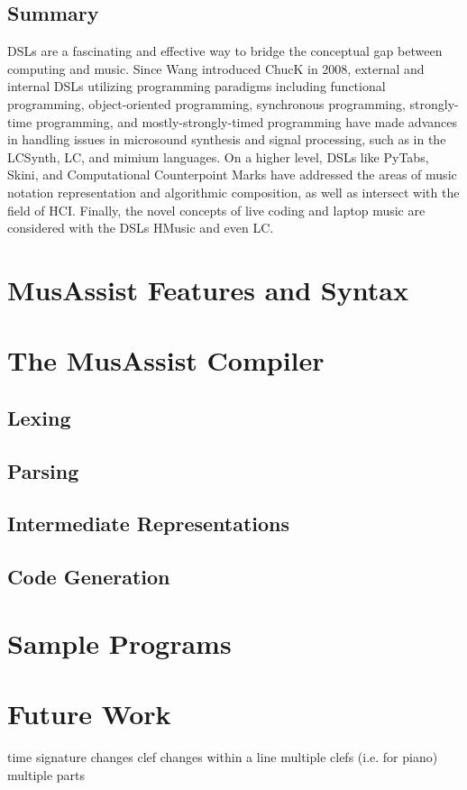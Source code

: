 \documentclass{report}
\begin{document}
\section{Summary}
DSLs are a fascinating and effective way to bridge the conceptual gap between computing and music. Since Wang introduced ChucK in 2008, external and internal DSLs utilizing programming paradigms including functional programming, object-oriented programming, synchronous programming, strongly-time programming, and mostly-strongly-timed programming have made advances in handling issues in microsound synthesis and signal processing, such as in the LCSynth, LC, and mimium languages. On a higher level, DSLs like PyTabs, Skini, and Computational Counterpoint Marks have addressed the areas of music notation representation and algorithmic composition, as well as intersect with the field of HCI. Finally, the novel concepts of live coding and laptop music are considered with the DSLs HMusic and even LC. 

\chapter{MusAssist Features and Syntax}

\chapter{The MusAssist Compiler}
\section{Lexing}
\section{Parsing}
\section{Intermediate Representations}
\section{Code Generation}

\chapter{Sample Programs}

\chapter{Future Work}
time signature changes
clef changes within a line
multiple clefs (i.e. for piano)
multiple parts
\end{document}

